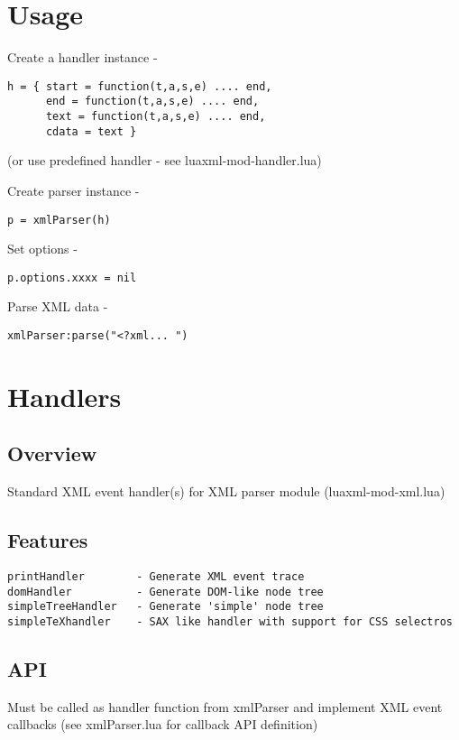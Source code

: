 \documentclass{ltxdoc}
\begin{document}
\section{Usage}

Create a handler instance -

\begin{verbatim}
h = { start = function(t,a,s,e) .... end,
      end = function(t,a,s,e) .... end,
      text = function(t,a,s,e) .... end,
      cdata = text }
\end{verbatim}
(or use predefined handler - see luaxml-mod-handler.lua)

Create parser instance -

\begin{verbatim}
p = xmlParser(h)
\end{verbatim}
Set options -

\begin{verbatim}
p.options.xxxx = nil
\end{verbatim}
Parse XML data -

\begin{verbatim}
xmlParser:parse("<?xml... ")
\end{verbatim}
\section{Handlers}\label{sec:handlers}

\subsection{Overview}

Standard XML event handler(s) for XML parser module (luaxml-mod-xml.lua)

\subsection{Features}

\begin{verbatim}
printHandler        - Generate XML event trace
domHandler          - Generate DOM-like node tree
simpleTreeHandler   - Generate 'simple' node tree
simpleTeXhandler    - SAX like handler with support for CSS selectros
\end{verbatim}
\subsection{API}

Must be called as handler function from xmlParser and implement XML
event callbacks (see xmlParser.lua for callback API definition)
\end{document}

